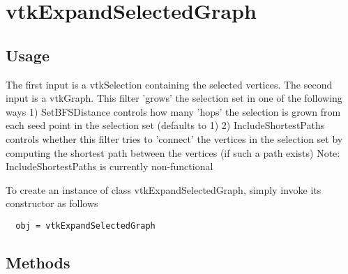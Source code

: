 \section{vtkExpandSelectedGraph}

\subsection{Usage}

 The first input is a vtkSelection containing the selected vertices.
 The second input is a vtkGraph.
 This filter 'grows' the selection set in one of the following ways
 1) SetBFSDistance controls how many 'hops' the selection is grown
    from each seed point in the selection set (defaults to 1)
 2) IncludeShortestPaths controls whether this filter tries to 
    'connect' the vertices in the selection set by computing the
    shortest path between the vertices (if such a path exists)
 Note: IncludeShortestPaths is currently non-functional

To create an instance of class vtkExpandSelectedGraph, simply
invoke its constructor as follows
\begin{verbatim}
  obj = vtkExpandSelectedGraph
\end{verbatim}
\subsection{Methods}

